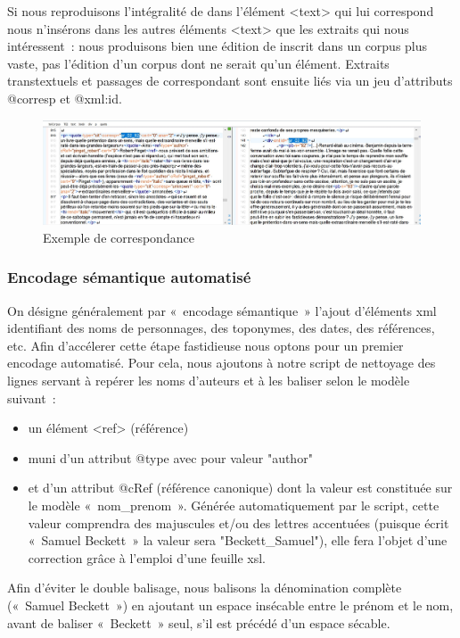 Si nous reproduisons l'intégralité de \punr{} dans l'élément <text> qui lui correspond nous n'insérons dans les autres éléments <text> que les extraits qui nous intéressent~: nous produisons bien une édition de \punr{} inscrit dans un corpus plus vaste, pas l'édition d'un corpus dont \punr{} ne serait qu'un élément. Extraits transtextuels et passages de \punr{} correspondant sont ensuite liés via un jeu d'attributs @corresp et @xml\NoAutoSpaceBeforeFDP:id.
\begin{figure}[H]
    \centering
    \includegraphics[scale=0.5]{img/screen_corresp.jpg}
    \caption{Exemple de correspondance}
    \label{fig:screen_corresp}
\end{figure}
\subsubsection{Encodage sémantique automatisé}

On désigne généralement par «~encodage sémantique~» l'ajout d'éléments xml identifiant des noms de personnages, des toponymes, des dates, des références, etc. Afin d'accélerer cette étape fastidieuse nous optons pour un premier encodage automatisé. Pour cela, nous ajoutons à notre script de nettoyage des lignes servant à repérer les noms d'auteurs et à les baliser selon le modèle suivant~:
\begin{itemize}
    \item un élément <ref> (référence)
    \item muni d'un attribut @type avec pour valeur "author"
    \item et d'un attribut @cRef (référence canonique) dont la valeur est constituée sur le modèle «~nom\_prenom~». Générée automatiquement par le script, cette valeur comprendra des majuscules et/ou des lettres accentuées (puisque \robbe{} écrit «~Samuel Beckett~» la valeur sera "Beckett\_Samuel"), elle fera l'objet d'une correction grâce à l'emploi d'une feuille xsl.
\end{itemize}
Afin d'éviter le double balisage, nous balisons la dénomination complète («~Samuel Beckett~») en ajoutant un espace insécable entre le prénom et le nom, avant de baliser «~Beckett~» seul, s'il est précédé d'un espace sécable.


